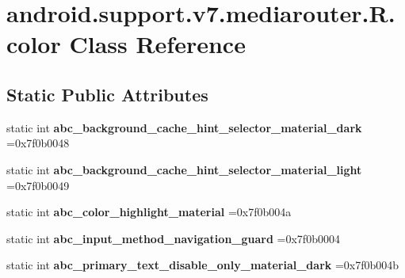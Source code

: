 \hypertarget{classandroid_1_1support_1_1v7_1_1mediarouter_1_1R_1_1color}{}\section{android.\+support.\+v7.\+mediarouter.\+R.\+color Class Reference}
\label{classandroid_1_1support_1_1v7_1_1mediarouter_1_1R_1_1color}
\subsection*{Static Public Attributes}
\begin{DoxyCompactItemize}
\item 
\mbox{\label{classandroid_1_1support_1_1v7_1_1mediarouter_1_1R_1_1color_a45a583c1f7a518ca0e88870393faa118}} 
static int {\bfseries abc\+\_\+background\+\_\+cache\+\_\+hint\+\_\+selector\+\_\+material\+\_\+dark} =0x7f0b0048
\item 
\mbox{\label{classandroid_1_1support_1_1v7_1_1mediarouter_1_1R_1_1color_adae3fae9beec48086687f5c19671493a}} 
static int {\bfseries abc\+\_\+background\+\_\+cache\+\_\+hint\+\_\+selector\+\_\+material\+\_\+light} =0x7f0b0049
\item 
\mbox{\label{classandroid_1_1support_1_1v7_1_1mediarouter_1_1R_1_1color_a7e31439bca536d5dc09e5169245442f2}} 
static int {\bfseries abc\+\_\+color\+\_\+highlight\+\_\+material} =0x7f0b004a
\item 
\mbox{\label{classandroid_1_1support_1_1v7_1_1mediarouter_1_1R_1_1color_ac6a456fe12e7eaafe035bbc6dc85efd6}} 
static int {\bfseries abc\+\_\+input\+\_\+method\+\_\+navigation\+\_\+guard} =0x7f0b0004
\item 
\mbox{\label{classandroid_1_1support_1_1v7_1_1mediarouter_1_1R_1_1color_a50a20dcb4d125055f44512f2e098fe8e}} 
static int {\bfseries abc\+\_\+primary\+\_\+text\+\_\+disable\+\_\+only\+\_\+material\+\_\+dark} =0x7f0b004b
\item 

\end{DoxyCompactItemize}
